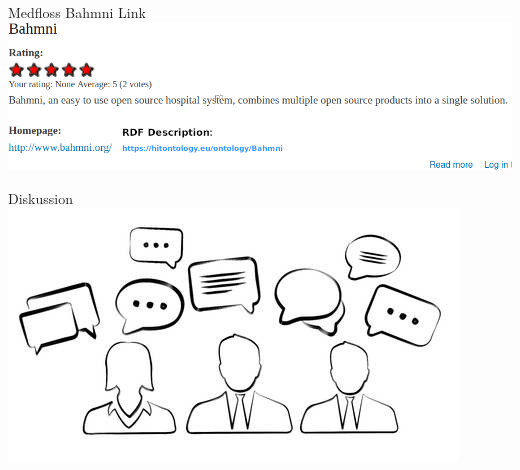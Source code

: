 \documentclass[aspectratio=1610,12pt]{beamer}
\begin{document}
\begin{frame}{Medfloss Bahmni Link}
  \includegraphics[width=\textwidth]{img/medfloss-bahmni-link.png}
\end{frame}


\begin{frame}{Diskussion}
  \centering
  \vspace{-0.5cm}
  \includegraphics[width=\textwidth]{img/discussion.png}
\end{frame}
\end{document}
